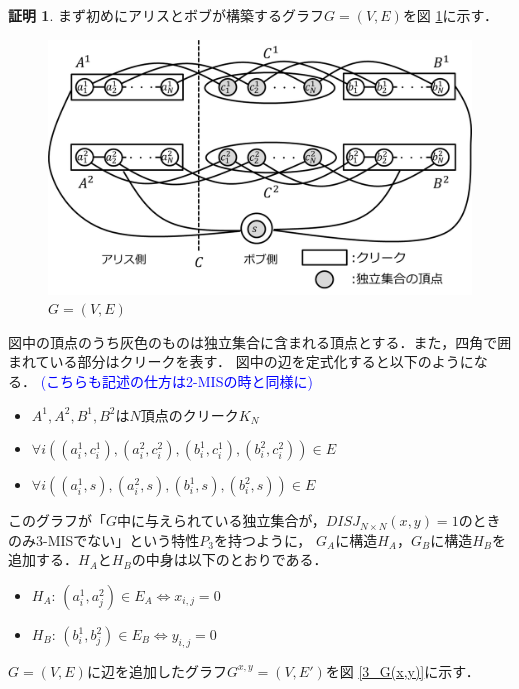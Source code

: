 \documentclass[12pt]{thesis}
\newcommand{\Izumi}[1]{\textcolor{blue}{(#1)}}
\theoremstyle{definition}
\newtheorem*{prf*}{証明}
\begin{document}
\begin{prf*}
まず初めにアリスとボブが構築するグラフ$G = (V, E)$を図 \ref{3_G}に示す．

\begin{figure}[ht]
\begin{center}
\includegraphics[width=120mm]{3_G.png}
\end{center}
\caption{$G = (V, E)$}
\label{3_G}
\end{figure}

図中の頂点のうち灰色のものは独立集合に含まれる頂点とする．また，四角で囲まれている部分はクリークを表す．
図中の辺を定式化すると以下のようになる．
\Izumi{こちらも記述の仕方は2-MISの時と同様に}
\begin{itemize}
\item $A^{1}, A^{2}, B^{1}, B^{2}$は$N$頂点のクリーク$K_{N}$
\item $\forall i((a_{i}^{1}, c_{i}^{1}), (a_{i}^{2}, c_{i}^{2}), (b_{i}^{1}, c_{i}^{1}), (b_{i}^{2}, c_{i}^{2})) \in E$
\item $\forall i((a_{i}^{1}, s), (a_{i}^{2}, s), (b_{i}^{1}, s), (b_{i}^{2}, s)) \in E$
\end{itemize}

このグラフが「$G$中に与えられている独立集合が，$DISJ_{N \times N} (x, y) = 1$のときのみ3-MISでない」という特性$P_{3}$を持つように，
$G_{A}$に構造$H_{A}$，$G_{B}$に構造$H_{B}$を追加する．$H_{A}$と$H_{B}$の中身は以下のとおりである．
\newpage
\begin{itemize}
\item $H_{A}$: $(a_{i}^{1}, a_{j}^{2}) \in E_{A} \Leftrightarrow x_{i, j} = 0$
\item $H_{B}$: $(b_{i}^{1}, b_{j}^{2}) \in E_{B} \Leftrightarrow y_{i, j} = 0$
\end{itemize}

$G = (V, E)$に辺を追加したグラフ$G^{x, y} = (V, E')$を図 \ref{3_G(x,y)}に示す．


\end{prf*}
\end{document}
